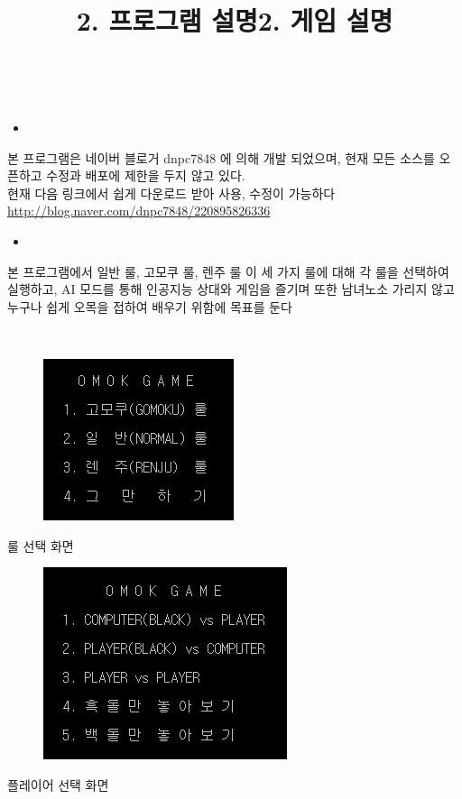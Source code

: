 \documentclass[a4paper, 11pt]{article}
\begin{document}
	\newpage
	\title{\textbf{\Huge2. 프로그램 설명}}\\
	\begin{itemize}
		\item {} 
	\end{itemize}
	{\Large
	본 프로그램은 네이버 블로거 dnpc7848 에 의해 개발 되었으며, 현재 모든 소스를 오픈하고 수정과 배포에 제한을 두지 않고 있다.\\
	현재 다음 링크에서 쉽게 다운로드 받아 사용, 수정이 가능하다\\
	\url{http://blog.naver.com/dnpc7848/220895826336}
	}
	\begin{itemize}
		\item {}
	\end{itemize}
	{\Large
		본 프로그램에서 일반 룰, 고모쿠 룰, 렌주 룰  이 세 가지 룰에 대해 각 룰을 선택하여 실행하고, AI 모드를 통해 인공지능 상대와 게임을 즐기며 또한 남녀노소 가리지 않고 누구나 쉽게 오목을 접하여 배우기 위함에 목표를 둔다
	}
	\newpage
	\title{\textbf{\Huge2. 게임 설명}}\\
	\begin{figure}[h] %
		\begin{center}
			\includegraphics[width=0.5\linewidth]{first.png}
		\end{center}
		\label{fig:long}
		\label{fig:onecol}
	\end{figure}
\begin{center}
		{\Large 룰 선택 화면}
\end{center}




\begin{figure}[h] %
	\begin{center}
		\includegraphics[width=0.5\linewidth]{second.png}
	\end{center}
	\label{fig:long}
	\label{fig:onecol}
\end{figure}
\begin{center}
	{\Large 플레이어 선택 화면}
\end{center}
\end{document}
